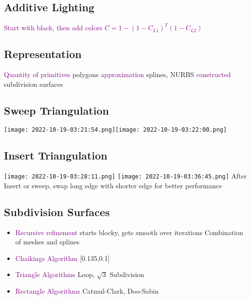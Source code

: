 \documentclass[main.tex,fontsize=12pt,paper=a4,paper=landscape,DIV=calc,]{scrartcl}
\begin{document}
\begin{multicols*}{4}
\subsection{Additive Lighting}
\textcolor{purple}{Start with black, then add colors}\newline
\textcolor{purple}{\(C = 1 - (1 - C_{L1} )^T (1 - C_{L2} )\)}

\subsection{Representation}
\textcolor{purple}{Quantity of primitives} polygons\newline
\textcolor{purple}{approximation} splines, NURBS\newline
\textcolor{purple}{constructed} subdivision surfaces

\subsection{Sweep Triangulation}
\texttt{[image: 2022-10-19-03:21:54.png]}\texttt{[image: 2022-10-19-03:22:00.png]}\newline

\subsection{Insert Triangulation}
\texttt{[image: 2022-10-19-03:28:11.png]}
\texttt{[image: 2022-10-19-03:36:45.png]}\newline
After Insert or sweep, swap long edge with shorter edge for better performance\newline

\subsection{Subdivision Surfaces}
\begin{itemize}
\item \textcolor{purple}{Recursive refinement}\newline
starts blocky, gets smooth over iterations\newline
\textcolor{OliveGreen}{Combination of meshes and splines}
\item \textcolor{purple}{Chaikings Algorithm}\newline
{}[0.135,0.1]
\item \textcolor{purple}{Triangle Algorithms}\newline
  Loop, \(\sqrt{3}\) Subdivision
\item \textcolor{purple}{Rectangle Algorithms}\newline
  Catmul-Clark, Doo-Sabin
\end{itemize}


\end{multicols*}
\end{document}
